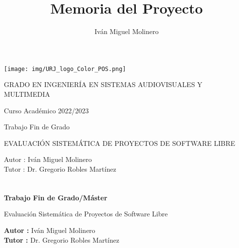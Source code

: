\documentclass[a4paper, 12pt]{book}
\title{Memoria del Proyecto}
\author{Iván Miguel Molinero}
\begin{document}
\renewcommand{\refname}{Bibliografía}  %
\renewcommand{\appendixname}{Apéndice}


\begin{titlepage}
\begin{center}
\texttt{[image: img/URJ\_logo\_Color\_POS.png]}

\vspace{1.75cm}

\Large
GRADO EN INGENIERÍA EN SISTEMAS AUDIOVISUALES
Y MULTIMEDIA

\vspace{0.4cm}

\large
Curso Académico 2022/2023

\vspace{0.8cm}

Trabajo Fin de Grado

\vspace{2.5cm}

\LARGE
EVALUACIÓN SISTEMÁTICA DE PROYECTOS DE SOFTWARE LIBRE

\vspace{4cm}

\large
Autor : Iván Miguel Molinero \\
Tutor : Dr. Gregorio Robles Martínez
\end{center}
\end{titlepage}

\newpage
\mbox{}
\thispagestyle{empty} %


\clearpage
{}
\chapter*{}

\vspace{-4cm}
\begin{center}
\LARGE
\textbf{Trabajo Fin de Grado/Máster}

\vspace{1cm}
\large
Evaluación Sistemática de Proyectos de Software Libre

\vspace{1cm}
\large
\textbf{Autor :} Iván Miguel Molinero \\
\textbf{Tutor :} Dr. Gregorio Robles Martínez

\end{center}
\end{document}
